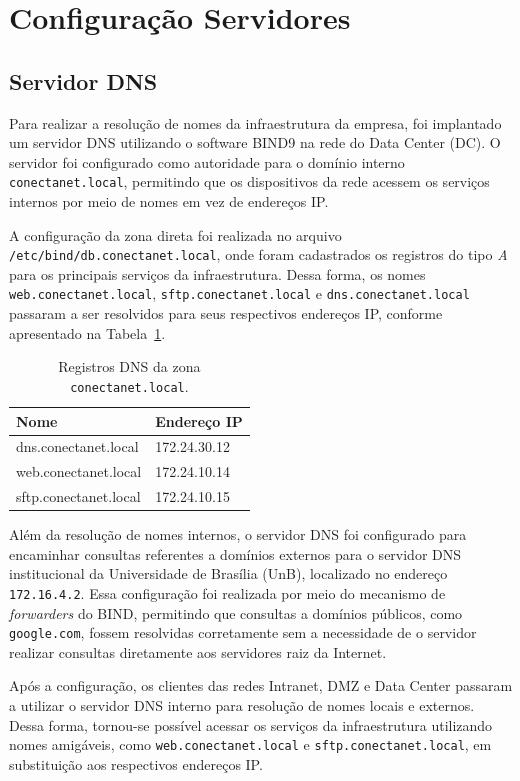 \section{Configuração Servidores}

\subsection{Servidor DNS}

Para realizar a resolução de nomes da infraestrutura da empresa, foi implantado um servidor DNS utilizando o software BIND9 na rede do Data Center (DC). O servidor foi configurado como autoridade para o domínio interno \texttt{conectanet.local}, permitindo que os dispositivos da rede acessem os serviços internos por meio de nomes em vez de endereços IP.

A configuração da zona direta foi realizada no arquivo \texttt{/etc/bind/db.conectanet.local}, onde foram cadastrados os registros do tipo \textit{A} para os principais serviços da infraestrutura. Dessa forma, os nomes \texttt{web.conectanet.local}, \texttt{sftp.conectanet.local} e \texttt{dns.conectanet.local} passaram a ser resolvidos para seus respectivos endereços IP, conforme apresentado na Tabela~\ref{tab:dns}.

\begin{table}[H]
\centering
\caption{Registros DNS da zona \texttt{conectanet.local}.}
\label{tab:dns}
\begin{tabular}{ll}
\hline
\textbf{Nome} & \textbf{Endereço IP} \\ \hline
dns.conectanet.local & 172.24.30.12 \\
web.conectanet.local & 172.24.10.14 \\
sftp.conectanet.local & 172.24.10.15 \\ \hline
\end{tabular}
\end{table}

Além da resolução de nomes internos, o servidor DNS foi configurado para encaminhar consultas referentes a domínios externos para o servidor DNS institucional da Universidade de Brasília (UnB), localizado no endereço \texttt{172.16.4.2}. Essa configuração foi realizada por meio do mecanismo de \textit{forwarders} do BIND, permitindo que consultas a domínios públicos, como \texttt{google.com}, fossem resolvidas corretamente sem a necessidade de o servidor realizar consultas diretamente aos servidores raiz da Internet.

Após a configuração, os clientes das redes Intranet, DMZ e Data Center passaram a utilizar o servidor DNS interno para resolução de nomes locais e externos. Dessa forma, tornou-se possível acessar os serviços da infraestrutura utilizando nomes amigáveis, como \texttt{web.conectanet.local} e \texttt{sftp.conectanet.local}, em substituição aos respectivos endereços IP.

